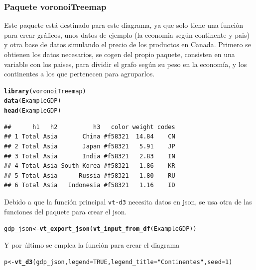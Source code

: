 \documentclass{article}\usepackage[]{graphicx}\usepackage[]{color}
\makeatletter
\newcommand{\hlnum}[1]{\textcolor[rgb]{0.686,0.059,0.569}{#1}}%
\newcommand{\hlstr}[1]{\textcolor[rgb]{0.192,0.494,0.8}{#1}}%
\newcommand{\hlstd}[1]{\textcolor[rgb]{0.345,0.345,0.345}{#1}}%
\newcommand{\hlkwb}[1]{\textcolor[rgb]{0.69,0.353,0.396}{#1}}%
\newcommand{\hlkwc}[1]{\textcolor[rgb]{0.333,0.667,0.333}{#1}}%
\newcommand{\hlkwd}[1]{\textcolor[rgb]{0.737,0.353,0.396}{\textbf{#1}}}%
\newenvironment{kframe}{%
 \def\at@end@of@kframe{}%
 \ifinner\ifhmode%
  \def\at@end@of@kframe{\end{minipage}}%
  \begin{minipage}{\columnwidth}%
 \fi\fi%
 \def\FrameCommand##1{\hskip\@totalleftmargin \hskip-\fboxsep
 \colorbox{shadecolor}{##1}\hskip-\fboxsep
     \hskip-\linewidth \hskip-\@totalleftmargin \hskip\columnwidth}%
 \MakeFramed {\advance\hsize-\width
   \@totalleftmargin\z@ \linewidth\hsize
   \@setminipage}}%
 {\par\unskip\endMakeFramed%
 \at@end@of@kframe}
\newenvironment{knitrout}{}{} %
\makeatother
\begin{document}
\subsubsection{Paquete voronoiTreemap}
Este paquete\cite{docu_voronoitreemap} est\'a destinado para este diagrama, ya que solo tiene una funci\'on para crear  gr\'aficos, unos datos de ejemplo (la economia seg\'un continente y pais) y otra base de datos simulando el precio de los productos en Canada.
Primero se obtienen los datos necesarios, se cogen del propio paquete, consisten en una variable con los paises, para dividir el grafo seg\'un su peso en la econom\'ia, y los continentes a los que pertenecen para agruparlos.
\begin{knitrout}
\color{fgcolor}\begin{kframe}
\begin{alltt}
\hlkwd{library}\hlstd{(voronoiTreemap)}
\hlkwd{data}\hlstd{(ExampleGDP)}
\hlkwd{head}\hlstd{(ExampleGDP)}
\end{alltt}
\begin{verbatim}
##      h1   h2          h3   color weight codes
## 1 Total Asia       China #f58321  14.84    CN
## 2 Total Asia       Japan #f58321   5.91    JP
## 3 Total Asia       India #f58321   2.83    IN
## 4 Total Asia South Korea #f58321   1.86    KR
## 5 Total Asia      Russia #f58321   1.80    RU
## 6 Total Asia   Indonesia #f58321   1.16    ID
\end{verbatim}
\end{kframe}
\end{knitrout}
Debido a que la funci\'on principal \texttt{vt-d3} necesita datos en json, se usa otra de las funciones del paquete para crear el json.
\begin{knitrout}
\color{fgcolor}\begin{kframe}
\begin{alltt}
\hlstd{gdp_json} \hlkwb{<-} \hlkwd{vt_export_json}\hlstd{(}\hlkwd{vt_input_from_df}\hlstd{(ExampleGDP))}
\end{alltt}
\end{kframe}
\end{knitrout}
Y por \'ultimo se emplea la funci\'on para crear el diagrama
\begin{knitrout}
\color{fgcolor}\begin{kframe}
\begin{alltt}
\hlstd{p} \hlkwb{<-} \hlkwd{vt_d3}\hlstd{(gdp_json,} \hlkwc{legend} \hlstd{=} \hlnum{TRUE}\hlstd{,} \hlkwc{legend_title} \hlstd{=} \hlstr{"Continentes"}\hlstd{,} \hlkwc{seed} \hlstd{=} \hlnum{1}\hlstd{)}
\end{alltt}
\end{kframe}
\end{knitrout}
\end{document}
